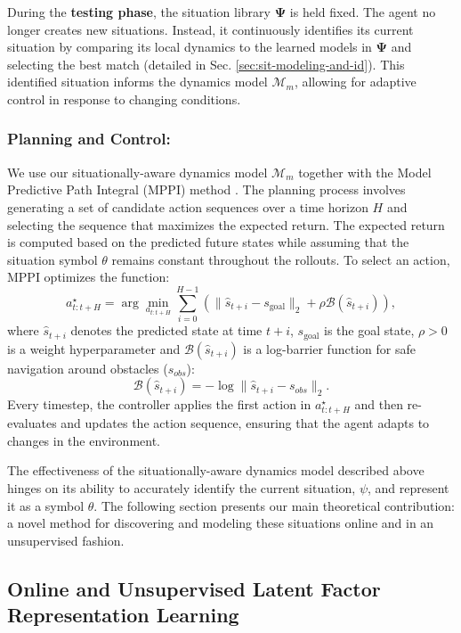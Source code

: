 \documentclass[Afour,sageh,times]{sagej}
\theoremstyle{lemma}
\begin{document}
During the \textbf{testing phase}, the situation library $\boldsymbol{\Psi}$ is held fixed. The agent no longer creates new situations. Instead, it continuously identifies its current situation by comparing its local dynamics to the learned models in $\boldsymbol{\Psi}$ and selecting the best match (detailed in Sec. \ref{sec:sit-modeling-and-id}). This identified situation informs the dynamics model $\mathcal{M}_m$, allowing for adaptive control in response to changing conditions.

\subsubsection{Planning and Control:}
We use our situationally-aware dynamics model $\mathcal{M}_m$ together with the Model Predictive Path Integral (MPPI) method \citep{gandhi2021robust}. The planning process involves generating a set of candidate action sequences over a time horizon $H$ and selecting the sequence that maximizes the expected return. The expected return is computed based on the predicted future states while assuming that the situation symbol $\theta$ remains constant throughout the rollouts. To select an action, MPPI optimizes the function:
\begin{equation}
    a^\star_{t:t+H} = \arg\min_{a_{t:t+H}} \sum_{i=0}^{H-1} \left( \| \hat{s}_{t+i} - s_{\text{goal}} \|_2 + \rho \mathcal{B}(\hat{s}_{t+i}) \right),
\end{equation}
where $\hat{s}_{t+i}$ denotes the predicted state at time $t+i$, $s_{\text{goal}}$ is the goal state, $\rho > 0$ is a weight hyperparameter and $\mathcal{B}(\hat{s}_{t+i})$ is a log-barrier function for safe navigation around obstacles ($s_{obs}$):
\begin{equation}
    \mathcal{B}(\hat{s}_{t+i}) = - \log  \|  \hat{s}_{t+i} - s_{obs} \|_2.
\end{equation} 
Every timestep, the controller applies the first action in $a^\star_{t:t+H}$ and then re-evaluates and updates the action sequence, ensuring that the agent adapts to changes in the environment. 

The effectiveness of the situationally-aware dynamics model described above hinges on its ability to accurately identify the current situation, $\psi$, and represent it as a symbol $\theta$. The following section presents our main theoretical contribution: a novel method for discovering and modeling these situations online and in an unsupervised fashion.

\subsection{Online and Unsupervised Latent Factor Representation Learning} \label{sec:online_unsupervised}
\end{document}
